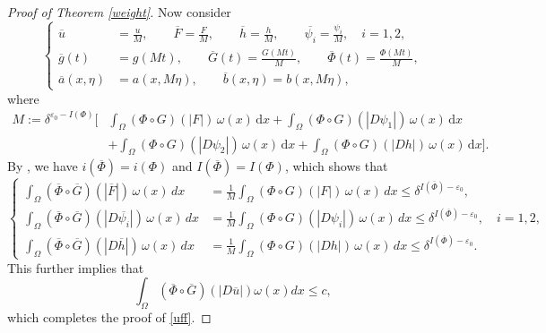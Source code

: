 \documentclass[10pt,a4paper]{article}
\theoremstyle{definition}
\numberwithin{equation}{section}
\newcommand{\ls}{\leqslant}
\begin{document}
\begin{proof}[Proof of Theorem \ref{weight}]
Now consider
\begin{equation*}
	\left\{
	\begin{aligned}
		\overline{u}
		&= \frac{u}{M},\qquad
		\overline{F}
		= \frac{F}{M},\qquad
		\overline{h}
		= \frac{h}{M},\qquad
		\overline{\psi_i}
		= \frac{\psi_i}{M},
		\quad i=1,2,
		\\[0.2cm]
		\overline{g}(t)
		&= g(Mt),\qquad
		\overline{G}(t)
		= \frac{G(Mt)}{M},\qquad
		\overline{\Phi}(t)
		= \frac{\Phi(Mt)}{M},
		\\[0.2cm]
		\overline{a}(x,\eta)
		&= a(x,M\eta),\qquad
		\overline{b}(x,\eta)
		= b(x,M\eta),
	\end{aligned}
	\right.
\end{equation*}
where
\begin{equation*}
	\begin{aligned}
		M:=\delta^{\varepsilon_0-I(\Phi)}
		\Bigg[
		&\int_{\Omega}(\Phi\circ G)(|F|)\,\omega(x)\,\mathrm{d}x
		+\int_{\Omega}(\Phi\circ G)(|D\psi_1|)\,\omega(x)\,\mathrm{d}x
		\\
		&+\int_{\Omega}(\Phi\circ G)(|D\psi_2|)\,\omega(x)\,\mathrm{d}x
		+\int_{\Omega}(\Phi\circ G)(|Dh|)\,\omega(x)\,\mathrm{d}x
		\Bigg].
	\end{aligned}
\end{equation*}
By \cite[Lemma 3.5]{cho}, we have $i(\overline{\Phi})=i(\Phi)$ and $I(\overline{\Phi})=I(\Phi)$,
which shows that
\begin{equation*}
	\left\{
	\begin{aligned}
		\int_{\Omega}
		(\overline{\Phi}\circ\overline{G})(|\overline{F}|)
		\,\omega(x)\,dx
		&=
		\frac{1}{M}
		\int_{\Omega}
		(\Phi\circ G)(|F|)
		\,\omega(x)\,dx
		\leq
		\delta^{I(\overline{\Phi})-\varepsilon_0},
		\\[0.2cm]
		\int_{\Omega}
		(\overline{\Phi}\circ\overline{G})(|D\overline{\psi_i}|)
		\,\omega(x)\,dx
		&=
		\frac{1}{M}
		\int_{\Omega}
		(\Phi\circ G)(|D\psi_i|)
		\,\omega(x)\,dx
		\leq
		\delta^{I(\overline{\Phi})-\varepsilon_0},
		\quad i=1,2,
		\\[0.2cm]
		\int_{\Omega}
		(\overline{\Phi}\circ\overline{G})(|D\overline{h}|)
		\,\omega(x)\,dx
		&=
		\frac{1}{M}
		\int_{\Omega}
		(\Phi\circ G)(|Dh|)
		\,\omega(x)\,dx
		\leq
		\delta^{I(\overline{\Phi})-\varepsilon_0}.
	\end{aligned}
	\right.
\end{equation*}
This further implies that
\begin{equation*}
\int_{\Omega}(\overline{\Phi}\circ \overline{G})(|D\overline{u}|)\omega(x)dx \ls c,
\end{equation*}
which completes the proof of \eqref{uff}.
\end{proof}
\end{document}
